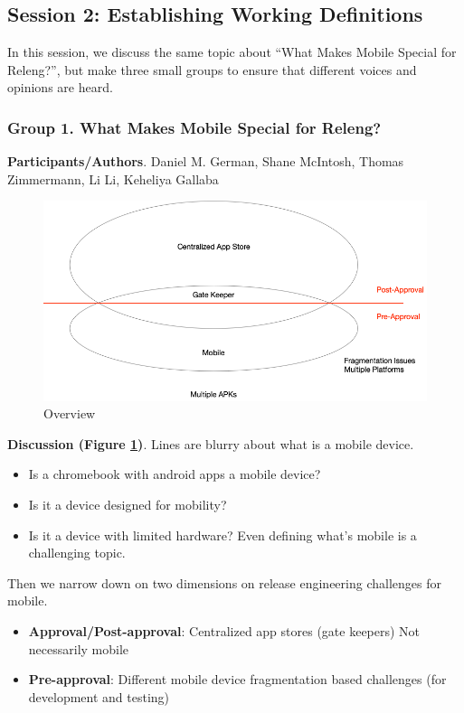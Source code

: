 \documentclass[a4paper]{article}
\newcommand{\smallsection}[1]{\noindent \textbf{#1}. }
\begin{document}
\subsection{Session 2: Establishing Working Definitions}
In this session, we discuss the same topic about ``What Makes Mobile Special for Releng?'', but make three small groups to ensure that different voices and opinions are heard. 

\subsubsection{Group 1. What Makes Mobile Special for Releng?}
\smallsection{Participants/Authors}
Daniel M. German, Shane McIntosh, Thomas Zimmermann, Li Li, Keheliya Gallaba

\begin{figure}[h] \label{figMobile}
\centering
\includegraphics[width=0.7\columnwidth]{fig/mobile.png}
\caption{Overview}
\end{figure}

\smallsection{Discussion (Figure \ref{figMobile})}
Lines are blurry about what is a mobile device.

\begin{itemize}
\tightlist
\item
    Is a chromebook with android apps a mobile device?
\item
    Is it a device designed for mobility?
\item
    Is it a device with limited hardware? Even defining what's mobile is a
challenging topic.
\end{itemize}

Then we narrow down on two dimensions on release engineering challenges
for mobile.

\begin{itemize}
\tightlist
\item
\textbf{Approval/Post-approval}: Centralized app stores
(gate keepers) Not necessarily mobile
\item
\textbf{Pre-approval}: Different
mobile device fragmentation based challenges (for development and
testing)
\end{itemize}
\end{document}
